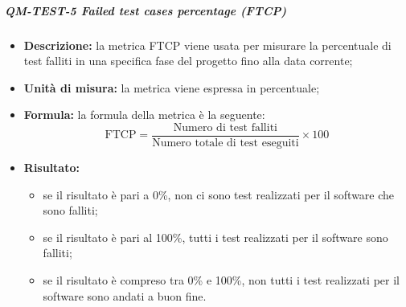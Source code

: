             \subparagraph{QM-TEST-5 Failed test cases percentage (FTCP)}
            \begin{itemize}
                \item \textbf{Descrizione: }
                la metrica FTCP viene usata per misurare la percentuale di test falliti in una specifica fase del progetto fino alla data corrente;

                \item \textbf{Unità di misura: }
                la metrica viene espressa in percentuale;

                \item \textbf{Formula: }
                la formula della metrica è la seguente:
                \[
                    \text{FTCP} = \frac{\text{Numero di test falliti}}{\text{Numero totale di test eseguiti}} \times 100
                \]

                \item \textbf{Risultato: }
                \begin{itemize}
                    \item se il risultato è pari a 0\%, non ci sono test realizzati per il software che sono falliti;
                    \item se il risultato è pari al 100\%, tutti i test realizzati per il software sono falliti;
                    \item se il risultato è compreso tra 0\% e 100\%, non tutti i test realizzati per il software sono andati a buon fine.
                \end{itemize}
            \end{itemize}

